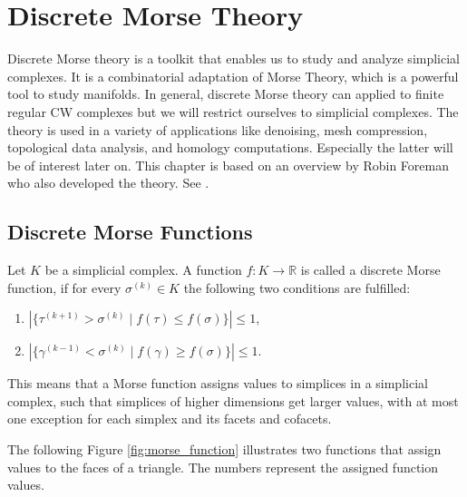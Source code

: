 
\chapter{Discrete Morse Theory}
Discrete Morse theory is a toolkit that enables us to study and analyze simplicial complexes. It is a combinatorial adaptation of Morse Theory, which is a powerful tool to study manifolds. In general, discrete Morse theory can applied to finite regular CW complexes but we will restrict ourselves to simplicial complexes. The theory is used in a variety of applications like denoising, mesh compression, topological data analysis, and homology computations. Especially the latter will be of interest later on. This chapter is based on an overview by Robin Foreman who also developed the theory. See \cite{Morse+Users+Guide}. 

\section{Discrete Morse Functions}

\begin{defi}
\label{def:discrete_morse_function}
Let $K$ be a simplicial complex. A function $f: K \rightarrow \mathbb{R}$ is called a discrete Morse function, if for every $\sigma^{(k)} \in K$ the following two conditions are fulfilled: 
\begin{enumerate}
    \item $|\{\tau^{(k+1)}>\sigma^{(k)} \mid f(\tau) \leq f(\sigma)\}| \leq 1$,
    \item $|\{\gamma^{(k-1)}<\sigma^{(k)} \mid f(\gamma) \geq f(\sigma)\}| \leq 1$.	
\end{enumerate}{}
\end{defi}

This means that a Morse function assigns values to simplices in a simplicial complex, such that simplices of higher dimensions get larger values, with at most one exception for each simplex and its facets and cofacets.

The following Figure \ref{fig:morse_function} illustrates two functions that assign values to the faces of a triangle. The numbers represent the assigned function values. 

